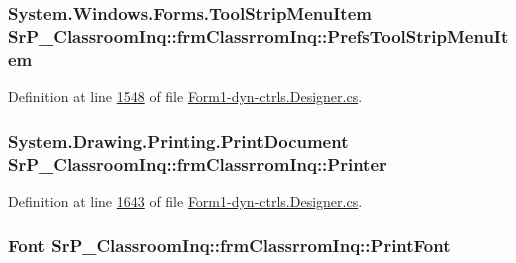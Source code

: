 \hypertarget{class_sr_p___classroom_inq_1_1frm_classrrom_inq_ab36e4efbf8b003fc5007cc6522901c21}{
\subsubsection[{\-Prefs\-Tool\-Strip\-Menu\-Item}]{\setlength{\rightskip}{0pt plus 5cm}\-System.\-Windows.\-Forms.\-Tool\-Strip\-Menu\-Item {\bf \-Sr\-P\-\_\-\-Classroom\-Inq\-::frm\-Classrrom\-Inq\-::\-Prefs\-Tool\-Strip\-Menu\-Item}}}
\label{class_sr_p___classroom_inq_1_1frm_classrrom_inq_ab36e4efbf8b003fc5007cc6522901c21}


\-Definition at line \hyperlink{_form1-dyn-ctrls_8_designer_8cs_source_l01548}{1548} of file \hyperlink{_form1-dyn-ctrls_8_designer_8cs_source}{\-Form1-\/dyn-\/ctrls.\-Designer.\-cs}.

\hypertarget{class_sr_p___classroom_inq_1_1frm_classrrom_inq_a27d138482c23d40f494f49984816227e}{
\subsubsection[{\-Printer}]{\setlength{\rightskip}{0pt plus 5cm}\-System.\-Drawing.\-Printing.\-Print\-Document {\bf \-Sr\-P\-\_\-\-Classroom\-Inq\-::frm\-Classrrom\-Inq\-::\-Printer}}}
\label{class_sr_p___classroom_inq_1_1frm_classrrom_inq_a27d138482c23d40f494f49984816227e}


\-Definition at line \hyperlink{_form1-dyn-ctrls_8_designer_8cs_source_l01643}{1643} of file \hyperlink{_form1-dyn-ctrls_8_designer_8cs_source}{\-Form1-\/dyn-\/ctrls.\-Designer.\-cs}.

\hypertarget{class_sr_p___classroom_inq_1_1frm_classrrom_inq_a314e4a61ea8458c5198273335dcf0b5f}{
\subsubsection[{\-Print\-Font}]{\setlength{\rightskip}{0pt plus 5cm}\-Font {\bf \-Sr\-P\-\_\-\-Classroom\-Inq\-::frm\-Classrrom\-Inq\-::\-Print\-Font}}}
\label{class_sr_p___classroom_inq_1_1frm_classrrom_inq_a314e4a61ea8458c5198273335dcf0b5f}


